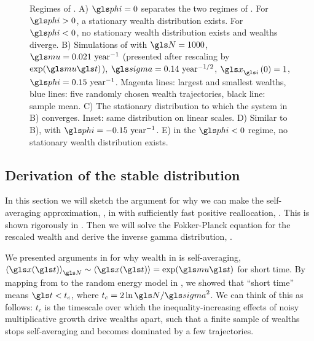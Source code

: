 \begin{figure}[!htb]
\caption{Regimes of \RGBM. A) $\gphi=0$ separates the two regimes of \RGBM. For $\gphi>0$, a stationary wealth distribution exists. For $\gphi<0$, no stationary wealth distribution exists and wealths diverge. B) Simulations of \RGBM with $\N=1000$, $\gmu=0.021 \text{ year}^{-1}$ (presented after rescaling by $\exp(\gmu \t)$), $\gsigma=0.14\text{ year}^{-1/2}$, $\x_\gi\left(0\right)=1$, $\gphi=0.15 \text{ year}^{-1}$. Magenta lines: largest and smallest wealths, blue lines: five randomly chosen wealth trajectories, black line: sample mean. C) The stationary distribution to which the system in B) converges. Inset: same distribution on linear scales. D) Similar to B), with $\gphi=-0.15 \text{ year}^{-1}$. E) in the $\gphi<0$ regime, no stationary wealth distribution exists.}
\end{figure}


\subsection{Derivation of the stable distribution}
In this section we will sketch the argument for why we can make the self-averaging approximation, , in \RGBM with sufficiently fast positive reallocation, . This is shown rigorously in \cite{Bouchaud2015b}. Then we will solve the Fokker-Planck equation for the rescaled wealth and derive the inverse gamma distribution, .

We presented arguments in  for why wealth in \GBM is self-averaging, $\ave{\x(\t)}_\N\sim\ave{\x(\t)}=\exp(\gmu \t)$ for short time. By mapping from \GBM to the random energy model in , we showed that ``short time'' means $\t<t_c$, where $t_c=2\ln \N/\gsigma^2$. We can think of this as follows: $t_c$ is the timescale over which the inequality-increasing effects of noisy multiplicative growth drive wealths apart, such that a finite sample of wealths stops self-averaging and becomes dominated by a few trajectories.

